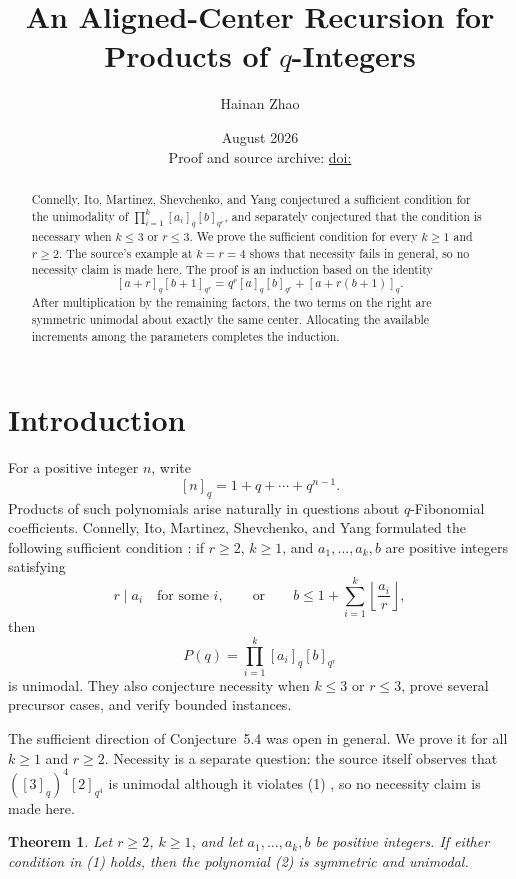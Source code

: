 \documentclass[11pt]{article}
\title{An Aligned-Center Recursion for Products of $q$-Integers}
\author{Hainan Zhao}
\date{August 2026\\[4pt]
\small Proof and source archive:
\href{https://doi.org/\archivedoi}{doi:\archivedoi}}
\newtheorem{theorem}{Theorem}
\begin{document}
\maketitle

\begin{abstract}
Connelly, Ito, Martinez, Shevchenko, and Yang conjectured a sufficient
condition for the unimodality of
\(\prod_{i=1}^k[a_i]_q[b]_{q^r}\), and separately conjectured that the
condition is necessary when \(k\leq3\) or \(r\leq3\).  We prove the
sufficient condition for every \(k\geq1\) and \(r\geq2\).  The source's
example at \(k=r=4\) shows that necessity fails in general, so no necessity
claim is made here.  The proof is an induction based on the identity
\[
 [a+r]_q[b+1]_{q^r}
 =q^r[a]_q[b]_{q^r}+[a+r(b+1)]_q.
\]
After multiplication by the remaining factors, the two terms on the right
are symmetric unimodal about exactly the same center.  Allocating the
available increments among the parameters completes the induction.
\end{abstract}

\section{Introduction}

For a positive integer \(n\), write
\[
 [n]_q=1+q+\cdots+q^{n-1}.
\]
Products of such polynomials arise naturally in questions about
\(q\)-Fibonomial coefficients.  Connelly, Ito, Martinez, Shevchenko, and
Yang formulated the following sufficient condition
\cite[Conjecture~5.4]{CIMSY}: if \(r\geq2\), \(k\geq1\), and
\(a_1,\ldots,a_k,b\) are positive integers satisfying
\[
 r\mid a_i\quad\text{for some }i,
 \qquad\text{or}\qquad
 b\leq1+\sum_{i=1}^k\left\lfloor\frac{a_i}{r}\right\rfloor,
 \tag{1}
\]
then
\[
 P(q)=\prod_{i=1}^k[a_i]_q[b]_{q^r}                 \tag{2}
\]
is unimodal.  They also conjecture necessity when \(k\leq3\) or
\(r\leq3\), prove several precursor cases, and verify bounded instances.

The sufficient direction of Conjecture~5.4 was open in general.  We prove it
for all \(k\geq1\) and \(r\geq2\).  Necessity is a separate question: the
source itself observes that \(([3]_q)^4[2]_{q^4}\) is unimodal although it
violates (1) \cite[after Conjecture~5.4]{CIMSY}, so no necessity claim is
made here.

\begin{theorem}\label{thm:main}
Let \(r\geq2\), \(k\geq1\), and let \(a_1,\ldots,a_k,b\) be positive
integers.  If either condition in \emph{(1)} holds, then the polynomial
\emph{(2)} is symmetric and unimodal.
\end{theorem}
\end{document}
